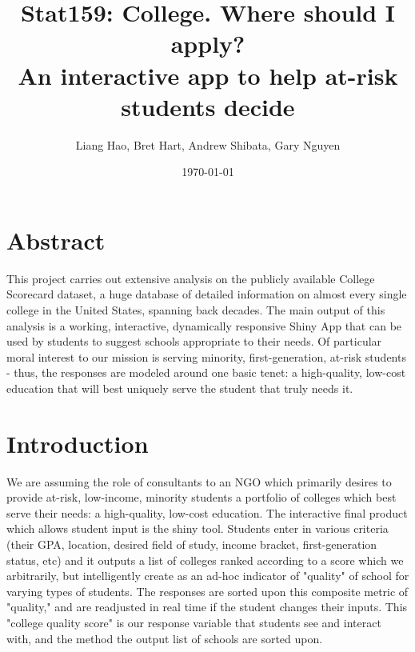 \documentclass{article}\usepackage[]{graphicx}\usepackage[]{color}
\title{Stat159: College. Where should I apply? \\ An interactive app to help at-risk students decide}
\author{Liang Hao, Bret Hart, Andrew Shibata, Gary Nguyen}
\date{\today}
\begin{document}
\maketitle
\section{Abstract}

This project carries out extensive analysis on the publicly available College Scorecard dataset, a huge database of detailed information on almost every single college in the United States, spanning back decades. The main output of this analysis is a working, interactive, dynamically responsive Shiny App that can be used by students to suggest schools appropriate to their needs. Of particular moral interest to our mission is serving minority, first-generation, at-risk students - thus, the responses are modeled around one basic tenet: a high-quality, low-cost education that will best uniquely serve the student that truly needs it.


\maketitle
\section{Introduction}

We are assuming the role of consultants to an NGO which primarily desires to provide at-risk, low-income, minority students a portfolio of colleges which best serve their needs: a high-quality, low-cost education. The interactive final product which allows student input is the shiny tool. Students enter in various criteria (their GPA, location, desired field of study, income bracket, first-generation status, etc) and it outputs a list of colleges ranked according to a score which we arbitrarily, but intelligently create as an ad-hoc indicator of "quality" of school for varying types of students. The responses are sorted upon this composite metric of "quality," and are readjusted in real time if the student changes their inputs. This "college quality score" is our response variable that students see and interact with, and the method the output list of schools are sorted upon.\newline
\end{document}
